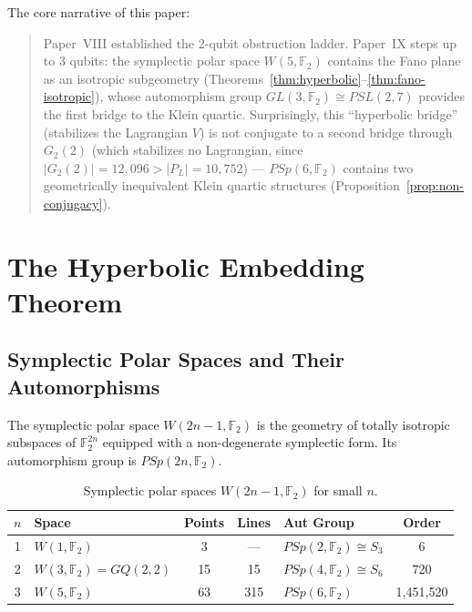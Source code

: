 \documentclass[11pt,a4paper]{article}
\theoremstyle{remark}
\newcommand{\F}{\mathbb{F}}
\begin{document}
The core narrative of this paper:

\begin{quote}
Paper~VIII established the 2-qubit obstruction ladder. Paper~IX steps up
to 3 qubits: the symplectic polar space $W(5, \F_2)$ contains the Fano
plane as an isotropic subgeometry (Theorems~\ref{thm:hyperbolic}--\ref{thm:fano-isotropic}),
whose automorphism group $GL(3, \F_2) \cong PSL(2, 7)$ provides the first
bridge to the Klein quartic. Surprisingly, this ``hyperbolic bridge'' (stabilizes the Lagrangian $V$)
is not conjugate to a second bridge through $G_2(2)$ (which stabilizes
no Lagrangian, since $|G_2(2)| = 12{,}096 > |P_L| = 10{,}752$) ---
$PSp(6, \F_2)$ contains two geometrically inequivalent Klein quartic
structures (Proposition~\ref{prop:non-conjugacy}).
\end{quote}

\section{The Hyperbolic Embedding Theorem}
\label{sec:hyperbolic}

\subsection{Symplectic Polar Spaces and Their Automorphisms}
\label{sec:sp-table}

The symplectic polar space $W(2n-1, \F_2)$ is the geometry of totally
isotropic subspaces of $\F_2^{2n}$ equipped with a non-degenerate
symplectic form. Its automorphism group is $PSp(2n, \F_2)$.

\begin{table}[h]
\centering
\begin{tabular}{c l c c l c}
\toprule
$n$ & Space & Points & Lines & Aut Group & Order \\
\midrule
1 & $W(1, \F_2)$ & 3 & --- & $PSp(2, \F_2) \cong S_3$ & 6 \\
2 & $W(3, \F_2) = GQ(2,2)$ & 15 & 15 & $PSp(4, \F_2) \cong S_6$ & 720 \\
3 & $W(5, \F_2)$ & 63 & 315 & $PSp(6, \F_2)$ & 1,451,520 \\
\bottomrule
\end{tabular}
\caption{Symplectic polar spaces $W(2n-1, \F_2)$ for small $n$.}
\label{tab:sp-table}
\end{table}
\end{document}
